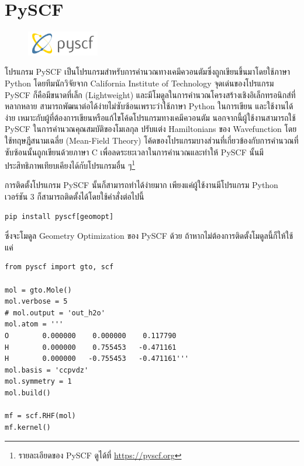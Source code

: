 \section{PySCF}
\label{sec:software_pyscf}

\begin{figure}
    \centering
    \includegraphics[width=0.28\textwidth]{fig/logo_pyscf.png}
    \label{fig:logo_pyscf}
\end{figure}

โปรแกรม PySCF เป็นโปรแกรมสำหรับการคำนวณทางเคมีควอนตัมซึ่งถูกเขียนขึ้นมาโดยใช้ภาษา Python โดยทีมนักวิจัยจาก California Institute of Technology\autocite{sun2018} จุดเด่นของโปรแกรม PySCF ก็คือมีขนาดที่เล็ก (Lightweight) และมีโมดูลในการคำนวณโครงสร้างเชิงอิเล็กทรอนิกส์ที่หลากหลาย สามารถพัฒนาต่อได้ง่ายไม่ซับซ้อนเพราะว่าใช้ภาษา Python ในการเขียน และใช้งานได้ง่าย เหมาะกับผู้ที่ต้องการเขียนหรือแก้ไขโค้ดโปรแกรมทางเคมีควอนตัม นอกจากนี้ผู้ใช้งานสามารถใช้ PySCF ในการคำนวณคุณสมบัติของโมเลกุล ปรับแต่ง Hamiltonians ของ Wavefunction โดยใช้ทฤษฎีสนามเฉลี่ย (Mean-Field Theory) โค้ดของโปรแกรมบางส่วนที่เกี่ยวข้องกับการคำนวณที่ซับซ้อนนั้นถูกเขียนด้วยภาษา C เพื่อลดระยะเวลาในการคำนวณและทำให้ PySCF นั้นมีประสิทธิภาพเทียบเคียงได้กับโปรแกรมอื่น ๆ\footnote{รายละเอียดของ PySCF ดูได้ที่ \url{https://pyscf.org}}

\noindent การติดตั้งโปรแกรม PySCF นั้นก็สามารถทำได้ง่ายมาก เพียงแค่ผู้ใช้งานมีโปรแกรม Python เวอร์ชัน 3 ก็สามารถติดตั้งได้โดยใช้คำสั่งต่อไปนี้

\begin{lstlisting}[style=MyBash]
pip install pyscf[geomopt]
\end{lstlisting}

\vspace{1em}
\noindent ซึ่งจะโมดูล Geometry Optimization ของ PySCF ด้วย ถ้าหากไม่ต้องการติดตั้งโมดูลนี้ก็ให้ใช้แค่ 

\begin{lstlisting}[style=MyPython]
from pyscf import gto, scf

mol = gto.Mole()
mol.verbose = 5
# mol.output = 'out_h2o'
mol.atom = '''
O        0.000000    0.000000    0.117790
H        0.000000    0.755453   -0.471161
H        0.000000   -0.755453   -0.471161'''
mol.basis = 'ccpvdz'
mol.symmetry = 1
mol.build()

mf = scf.RHF(mol)
mf.kernel()
\end{lstlisting}
